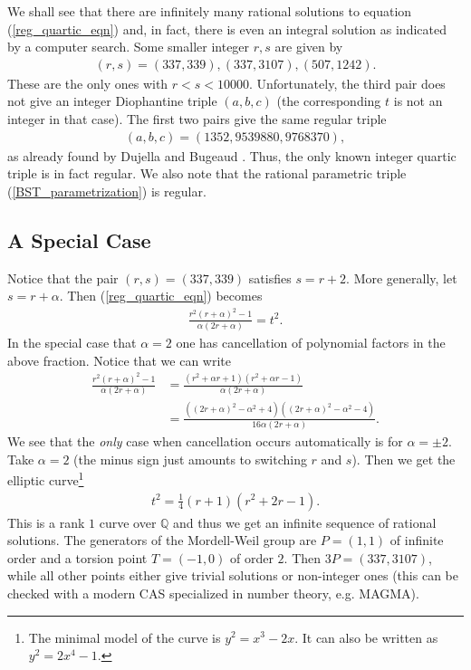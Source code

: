 \documentclass{amsart}
\begin{document}
We shall see that there are infinitely many rational solutions to equation (\ref{reg_quartic_eqn}) and, in fact, there is even an integral solution as indicated by a computer search. Some smaller integer $r,s$ are given by
\begin{align*}
    (r,s) = (337,339), (337,3107), (507,1242).
\end{align*}
These are the only ones with $r<s<10000$. Unfortunately, the third pair does not give an integer Diophantine triple $(a,b,c)$ (the corresponding $t$ is not an integer in that case). The first two pairs give the same regular triple
\begin{align*}
    (a,b,c) = (1352, 9539880, 9768370),
\end{align*}
as already found by Dujella and Bugeaud \cite{bugeaud2003problem}. Thus, the only known integer quartic triple is in fact regular. We also note that the rational parametric triple (\ref{BST_parametrization}) is regular.

\subsection{A Special Case}
Notice that the pair $(r,s)=(337,339)$ satisfies $s=r+2$. More generally, let $s = r + \alpha$. Then (\ref{reg_quartic_eqn}) becomes
\begin{align} \label{step_back}
    \frac{r^2(r+\alpha)^2-1}{\alpha(2r+\alpha)} = t^2.
\end{align}
In the special case that $\alpha=2$ one has cancellation of polynomial factors in the above fraction. Notice that we can write
\begin{align*}
    \frac{r^2(r+\alpha)^2-1}{\alpha(2r+\alpha)} &= \frac{(r^2+\alpha r +1)(r^2+\alpha r-1)}{\alpha(2r+\alpha)} \\
    &= \frac{\left((2r+\alpha)^2 - \alpha^2 + 4\right)\left((2r+\alpha)^2 - \alpha^2 - 4\right)}{16\alpha(2r+\alpha)}.
\end{align*}
We see that the \emph{only} case when cancellation occurs automatically is for $\alpha = \pm 2$. Take $\alpha=2$ (the minus sign just amounts to switching $r$ and $s$). Then we get the elliptic curve\footnote{The minimal model of the curve is $y^2=x^3-2x$. It can also be written as $y^2=2x^4-1$. }
\begin{align} \label{alphaje2}
    t^2 = \frac{1}{4}(r+1)(r^2+2r-1).
\end{align}
This is a rank $1$ curve over $\mathbb{Q}$ and thus we get an infinite sequence of rational solutions. The generators of the Mordell-Weil group are $P=(1,1)$ of infinite order and a torsion point $T=(-1,0)$ of order $2$. Then $3P = (337,3107)$, while all other points either give trivial solutions or non-integer ones (this can be checked with a modern CAS specialized in number theory, e.g. MAGMA).
\end{document}
